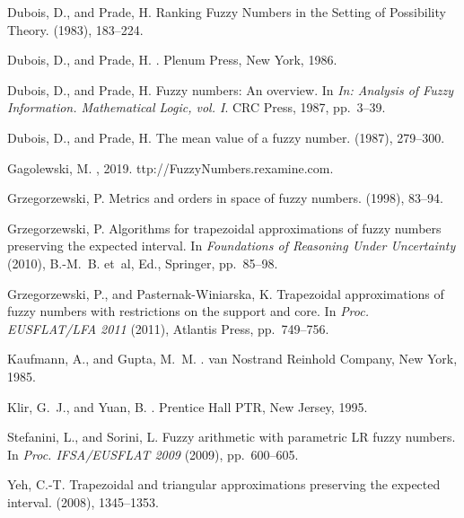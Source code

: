 \documentclass[11pt]{article}\usepackage[]{graphicx}\usepackage[]{color}
\begin{document}
\begin{thebibliography}{10}
{\sc Dubois, D., and Prade, H.}
\newblock Ranking Fuzzy Numbers in the Setting of Possibility Theory.
 (1983), 183--224.

{\sc Dubois, D., and Prade, H.}
.
\newblock Plenum Press, New York, 1986.

{\sc Dubois, D., and Prade, H.}
\newblock Fuzzy numbers: An overview.
\newblock In {\em In: Analysis of Fuzzy Information. Mathematical Logic, vol.
  I}. CRC Press, 1987, pp.~3--39.

{\sc Dubois, D., and Prade, H.}
\newblock The mean value of a fuzzy number.
 (1987), 279--300.

{\sc Gagolewski, M.}
, 2019.
ttp://FuzzyNumbers.rexamine.com.

{\sc Grzegorzewski, P.}
\newblock Metrics and orders in space of fuzzy numbers.
 (1998), 83--94.

{\sc Grzegorzewski, P.}
\newblock Algorithms for trapezoidal approximations of fuzzy numbers preserving
  the expected interval.
\newblock In {\em Foundations of Reasoning Under Uncertainty\/} (2010),
  B.-M.~B. et~al, Ed., Springer, pp.~85--98.

{\sc Grzegorzewski, P., and Pasternak-Winiarska, K.}
\newblock Trapezoidal approximations of fuzzy numbers with restrictions on the
  support and core.
\newblock In {\em Proc. EUSFLAT/LFA 2011\/} (2011), Atlantis Press,
  pp.~749--756.

{\sc Kaufmann, A., and Gupta, M.~M.}
.
\newblock van Nostrand Reinhold Company, New York, 1985.

{\sc Klir, G.~J., and Yuan, B.}
.
\newblock Prentice Hall PTR, New Jersey, 1995.

{\sc Stefanini, L., and Sorini, L.}
\newblock Fuzzy arithmetic with parametric {LR} fuzzy numbers.
\newblock In {\em Proc. IFSA/EUSFLAT 2009\/} (2009), pp.~600--605.

{\sc Yeh, C.-T.}
\newblock Trapezoidal and triangular approximations preserving the expected
  interval.
 (2008), 1345--1353.

\end{thebibliography}
\end{document}
